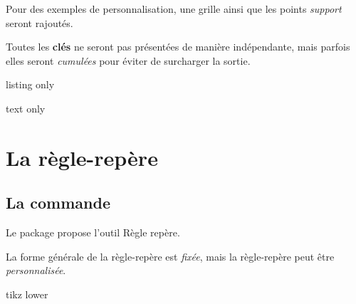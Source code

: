 \documentclass[french,a4paper,11pt]{article}
\newcommand\Cle[1]{{\bfseries\sffamily\textlangle #1\textrangle}}
\newcommand\affichegrille[4]{%
	\draw[xstep=1,ystep=1,lightgray] (#1,#3) grid (#2,#4) ;
	\foreach \x in {#1,\inteval{1+#1},...,#2} \draw[lightgray] (\x,#4)--++(0,3pt) node[font=\scriptsize,above] {$\x$} ;
	\foreach \y in {#3,\inteval{1+#3},...,#4} \draw[lightgray] (#1,\y)--++(-3pt,0) node[font=\scriptsize,left] {$\y$} ;
}
\newcommand\pointsutiles[1]{%
	\foreach \point in {#1} {\draw[thick,fill=red] \point circle[radius=3pt] ;}
}
\begin{document}
\begin{noteblock}
Pour des exemples de personnalisation, une grille ainsi que les points \textit{support} seront rajoutés.

\smallskip

Toutes les \Cle{clés} ne seront pas présentées de manière indépendante, mais parfois elles seront \textit{cumulées} pour éviter de surcharger la sortie.
\end{noteblock}

\begin{PresentationCode}{listing only}
\tkzRegle[Fond,CouleurFond=red]
\tkzRegle[Longueur=13,Largeur=2,Rotation=-45,Couleur=ForestGreen, Origine={(1,-3)},Fond,PosVal=hb]
\tkzRegle[Largeur=1.25,Longueur=9,Couleur=blue,Rotation=20,Origine={(0,3)}, AfficheValeurs=false]
\end{PresentationCode}

\begin{PresentationCode}{text only}
\end{PresentationCode}

\pagebreak

\section{La règle-repère}

\subsection{La commande}

\begin{cautionblock}
Le package propose l'outil \textsf{Règle repère}.

La forme générale de la règle-repère est \textit{fixée}, mais la règle-repère peut être \textit{personnalisée}.
\end{cautionblock}

\begin{PresentationCode}{tikz lower}
\tkzRegleRepere
\end{PresentationCode}
\end{document}
